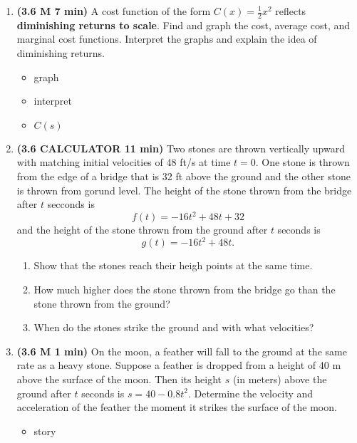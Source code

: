 \documentclass[12pt]{article}
\begin{document}
\begin{enumerate}[1.]
\item {\bf (3.6 M 7 min)} A cost function of the form $C(x)=\frac{1}{2}x^2$ reflects \textbf{diminishing returns to scale}.  Find and graph the cost, average cost, and marginal cost functions.  Interpret the graphs and explain the idea of diminishing returns.
{\bf\begin{itemize}
\item graph
\item interpret
\item $C(s)$
\end{itemize}}

\item {\bf (3.6 CALCULATOR 11 min)} Two stones are thrown vertically upward with matching initial velocities of 48 ft/s at time $t=0$.  One stone is thrown from the edge of a bridge that is 32 ft above the ground and the other stone is thrown from gorund level.  The height of the stone thrown from the bridge after $t$ secconds is
\[
f(t)=-16t^2+48t+32
\]
and the height of the stone thrown from the ground after $t$ seconds is 
\[
g(t)=-16t^2+48t.
\]

\begin{enumerate}
	\item Show that the stones reach their heigh points at the same time.
	
	\item How much higher does the stone thrown from the bridge go than the stone thrown from the ground?
	
	\item When do the stones strike the ground and with what velocities?
\end{enumerate}

\item {\bf (3.6 M 1 min)} On the moon, a feather will fall to the ground at the same rate as a heavy stone.  Suppose a feather is dropped from a height of 40 m above the surface of the moon.  Then its height $s$ (in meters) above the ground after $t$ seconds is $s=40-0.8t^2$.  Determine the velocity and acceleration of the feather the moment it strikes the surface of the moon.
{\bf\begin{itemize}
\item story
\end{itemize}}


\end{enumerate}
\end{document}
